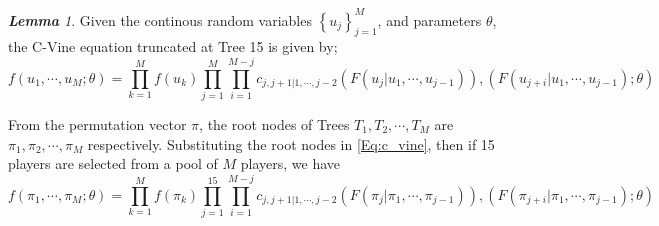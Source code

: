 \documentclass[12pt,oneside,a4paper]{book}
\theoremstyle{definition}
\theoremstyle{remark}
\newtheorem{lem}{\bf Lemma}[section]
\begin{document}
				\begin{lem}\cite{bibid}
					Given the continous random variables $\left\{u_{j}\right\}_{j=1}^{M}$, and parameters $\theta$, the C-Vine equation truncated at Tree 15 is given by;
					\begin{equation}\label{Eq:c_vine}
						f\left(u_1, \cdots, u_M ; \theta \right) = \prod_{k=1}^{M}f\left(u_{k}\right) \prod_{j=1}^{M} \prod_{i=1}^{M-j}
						c_{j, j+1 | 1, \cdots, j-2}
						\left( F\left(u_{j} | u_1, \cdots, u_{j-1}\right)\right), \left( F\left(u_{j+i} | u_1, \cdots, u_{j-1}\right); \theta\right)
					\end{equation}
				\end{lem}

				From the permutation vector $\pi$, the root nodes of Trees $T_1, T_2, \cdots, T_M$ are $\pi_1, \pi_2, \cdots, \pi_{M}$ respectively. Substituting the root nodes in \ref{Eq:c_vine}, then if 15 players are selected from a pool of $M$ players, we have
				\begin{equation}\label{Eq:c_vine_pi}
					f\left(\pi_1, \cdots, \pi_M ; \theta \right) = \prod_{k=1}^{M}f\left(\pi_{k}\right) \prod_{j=1}^{15} \prod_{i=1}^{M-j}
					c_{j, j+1 | 1, \cdots, j-2}
					\left( F\left(\pi_{j} | \pi_1, \cdots, \pi_{j-1}\right)\right), \left( F\left(\pi_{j+i} | \pi_1, \cdots, \pi_{j-1}\right); \theta\right)
				\end{equation}
\end{document}
